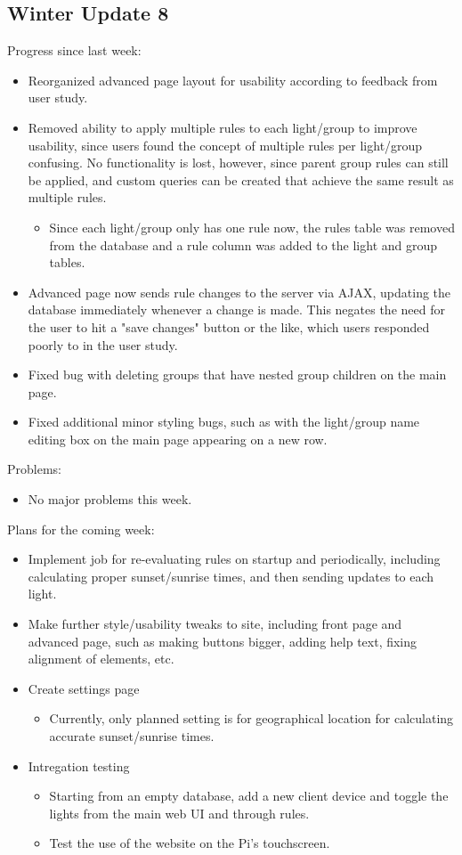 \subsection{Winter Update 8}
Progress since last week:
\begin{itemize}
   \item Reorganized advanced page layout for usability according to feedback from user study.
   \item Removed ability to apply multiple rules to each light/group to improve usability, since users found the concept of multiple rules per light/group confusing.  No functionality is lost, however, since parent group rules can still be applied, and custom queries can be created that achieve the same result as multiple rules.
      \begin{itemize}
         \item Since each light/group only has one rule now, the rules table was removed from the database and a rule column was added to the light and group tables.
      \end{itemize}
   \item Advanced page now sends rule changes to the server via AJAX, updating the database immediately whenever a change is made.  This negates the need for the user to hit a "save changes" button or the like, which users responded poorly to in the user study.
   \item Fixed bug with deleting groups that have nested group children on the main page.
   \item Fixed additional minor styling bugs, such as with the light/group name editing box on the main page appearing on a new row.
\end{itemize}
Problems:
\begin{itemize}
   \item No major problems this week.
\end{itemize}
Plans for the coming week:
\begin{itemize}
   \item Implement job for re-evaluating rules on startup and periodically, including calculating proper sunset/sunrise times, and then sending updates to each light.
   \item Make further style/usability tweaks to site, including front page and advanced page, such as making buttons bigger, adding help text, fixing alignment of elements, etc.
   \item Create settings page
      \begin{itemize}
         \item Currently, only planned setting is for geographical location for calculating accurate sunset/sunrise times.
      \end{itemize}
   \item Intregation testing
      \begin{itemize}
         \item Starting from an empty database, add a new client device and toggle the lights from the main web UI and through rules.
         \item Test the use of the website on the Pi's touchscreen.
      \end{itemize}
\end{itemize}
